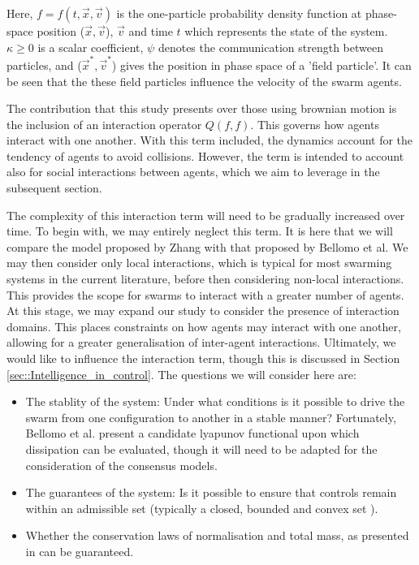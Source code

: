 \documentclass[.../main.tex]{subfiles}
\begin{document}
    Here, $f = f(t, \Vec{x}, \Vec{v})$ is the one-particle probability density function at
    phase-space position ($\Vec{x}, \Vec{v}$), $\Vec{v}$ and time $t$ which represents the state of
    the system. $\kappa \geq 0$ is a scalar
    coefficient, $\psi$ denotes the communication strength between particles, and ($\Vec{x}^*, \Vec
    {v}^*$) gives the position in phase space of a 'field particle'. It can be seen that the these
    field particles influence the velocity of the swarm agents.

	The contribution that this study presents over those using brownian motion is the inclusion of an
	interaction operator $Q(f, f)$. This governs how agents interact with one another. With this
	term included, the dynamics account for the tendency of agents to avoid collisions. However,
	the term is intended to account also for social interactions between agents, which we aim to
	leverage in the subsequent section.

	The complexity of this interaction term will need to be gradually increased over time. To begin
	with, we may entirely neglect this term. It is here that we will compare the model proposed by Zhang
	with that proposed by Bellomo et al. We may then consider only local interactions, which is typical
	for most swarming systems in the current literature, before then considering non-local interactions.
	This provides the scope for swarms to interact with a greater number of agents. At this stage, we
	may expand our study to consider the presence of interaction domains. This places constraints on how
	agents may interact with one another, allowing for a greater generalisation of inter-agent
	interactions. Ultimately, we would like to influence the interaction term, though this is discussed
	in Section \ref{sec::Intelligence_in_control}. The questions we will
	consider here are:

	\begin{itemize}
		\item The stablity of the system: Under what conditions is it possible to drive the
		swarm from one configuration to another in a stable manner? Fortunately, Bellomo et al.
		present a candidate lyapunov functional upon which dissipation can be evaluated, though it
		will need to be adapted for the consideration of the consensus models.
		\item The guarantees of the system: Is it possible to ensure that controls remain within an
		admissible set (typically a closed, bounded and convex set \cite{Fredi2010}).
		\item Whether the conservation laws of normalisation and total mass, as presented in 
		\cite{Bellomo2017} can be guaranteed.
	\end{itemize}
\end{document}
